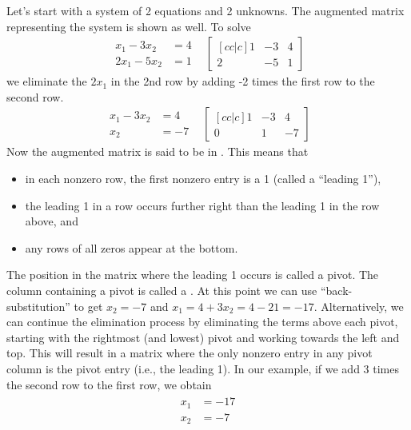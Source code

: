 {\begin{example}
Let's start with a system of 2 equations and 2 unknowns. The augmented
matrix representing the system is shown as well. To solve $$
\begin{array}{rr}
\begin{array}{rl}
x_1-3x_2&=4\\
2x_1-5x_2&=1 
\end{array}
&
\begin{bmatrix}[cc|c] 1&-3&4\\2&-5&1
\end{bmatrix} 
\end{array}
$$
we eliminate the $2x_1$ in the 2nd row by adding -2 times the first row to the second row.
$$\begin{array}{rr}
\begin{array}{rl}
x_1-3x_2&=4\\
x_2&=-7 
\end{array}
&
\begin{bmatrix}[cc|c] 1&-3&4\\0&1&-7
\end{bmatrix} 
\end{array}
$$
Now the augmented matrix is said to be in . This means that 
\begin{itemize}
	\item in each nonzero row, the first nonzero entry is a 1 (called a ``leading 1''),
  \item the leading 1 in a row occurs further right than the leading 1 in the row above, and
  \item any rows of all zeros appear at the bottom.
\end{itemize}
The position in the matrix where the leading 1 occurs is called a pivot. 
The column containing a pivot is called a . 
At this point we can use ``back-substitution'' to get {$x_2=-7$} and {$x_1=4+3x_2 = 4-21=-17$}. 
Alternatively, we can continue the elimination process by eliminating
the terms above each pivot, starting with the rightmost (and lowest) pivot and
working towards the left and top.
This will result in a matrix where the only nonzero entry in any pivot column is the pivot entry (i.e., the leading 1). 
In our example, if we add 3 times the second row to the first row, we obtain
$$\begin{array}{rr}
\begin{array}{rl}
x_1&=-17\\
x_2&=-7 
\end{array}

\end{array}$$
\end{example}}

